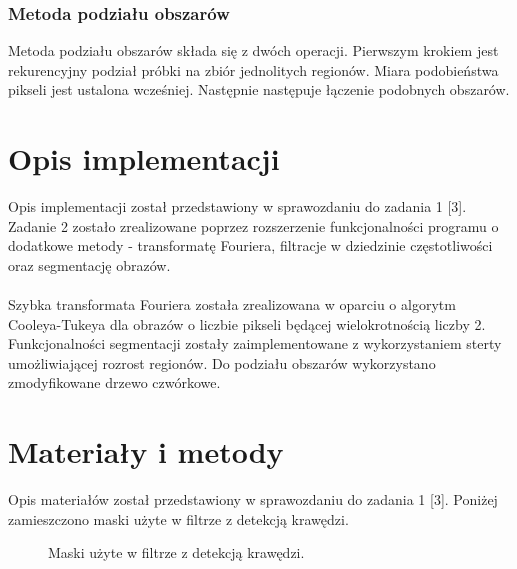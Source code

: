 \documentclass{classrep}
\begin{document}
\subsubsection{Metoda podziału obszarów}
Metoda podziału obszarów składa się z dwóch operacji. Pierwszym krokiem jest rekurencyjny podział próbki na zbiór jednolitych regionów. Miara podobieństwa pikseli jest ustalona wcześniej. Następnie następuje łączenie podobnych obszarów.

\section{Opis implementacji}
Opis implementacji został przedstawiony w sprawozdaniu do zadania 1 [3]. Zadanie 2 zostało zrealizowane poprzez rozszerzenie funkcjonalności programu o dodatkowe metody - transformatę Fouriera, filtracje w dziedzinie częstotliwości oraz segmentację obrazów.\\
\\
\indent
Szybka transformata Fouriera została zrealizowana w oparciu o algorytm Cooleya-Tukeya dla obrazów o liczbie pikseli będącej wielokrotnością liczby 2. Funkcjonalności segmentacji zostały zaimplementowane z wykorzystaniem sterty umożliwiającej rozrost regionów. Do podziału obszarów wykorzystano zmodyfikowane drzewo czwórkowe.

\section{Materiały i metody}
Opis materiałów został przedstawiony w sprawozdaniu do zadania 1 [3]. Poniżej zamieszczono maski użyte w filtrze z detekcją krawędzi.
\begin{figure}[H]%
    \centering
    \qquad
    \qquad
    \caption{Maski użyte w filtrze z detekcją krawędzi.}%
\end{figure} 
\end{document}
